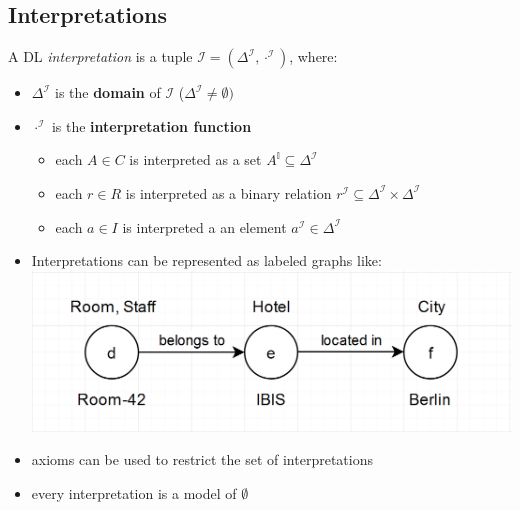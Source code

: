 \documentclass[12pt,a4paper]{article}
\begin{document}
\subsection{Interpretations}
A DL \textit{interpretation} is a tuple $\mathcal{I} = (\Delta^\mathcal{I}, \cdot^\mathcal{I})$, where:
\begin{itemize}
\item $\Delta^\mathcal{I}$ is the \textbf{domain} of $\mathcal{I}$ ($\Delta^\mathcal{I} \neq \emptyset)$
\item $\cdot^\mathcal{I}$ is the \textbf{interpretation function}
\begin{itemize}
\item each $A\in C$ is interpreted as a set $A^\mathbb{I} \subseteq \Delta^\mathcal{I}$
\item each $r\in R$ is interpreted as a binary relation $r^\mathcal{I} \subseteq \Delta^\mathcal{I} \times \Delta^\mathcal{I}$
\item each $a\in I$ is interpreted a an element $a^\mathcal{I} \in \Delta^\mathcal{I}$
\end{itemize}
\item Interpretations can be represented as labeled graphs like:\\
\includegraphics[scale=0.35]{./resources/alc_graph1.png}
\item axioms can be used to restrict the set of interpretations
\item every interpretation is a model of $\emptyset$
\end{itemize}
\flushleft
\end{document}
